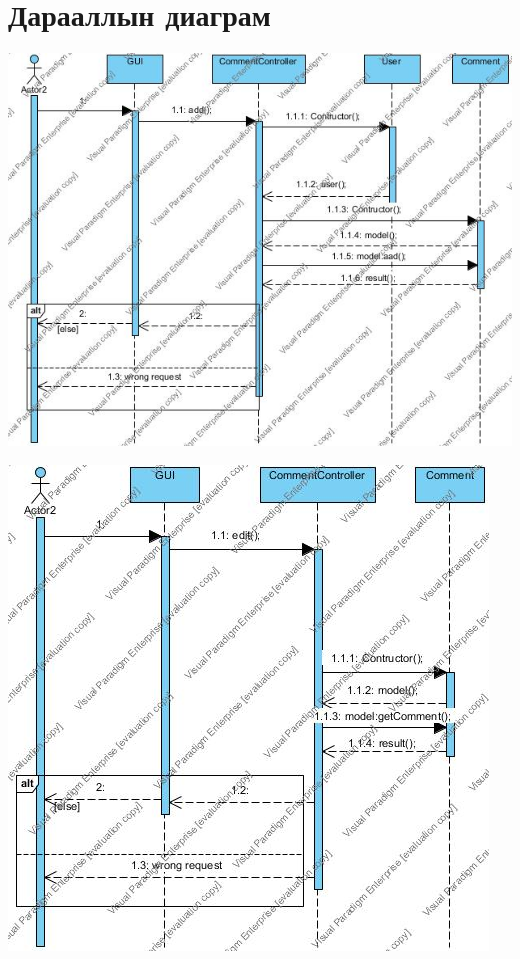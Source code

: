 \documentclass[12pt]{article}
\begin{document}
\section{Дарааллын диаграм}
\includegraphics[scale=0.5]{Sequence01} 

\includegraphics[scale=0.5]{Sequence02} 
\end{document}
